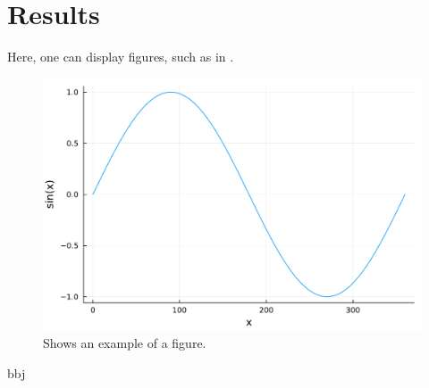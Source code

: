 \section{Results}

Here, one can display figures, such as in .

\begin{figure}
    \centering
    \includegraphics[width=\singlefigure]{figures/example.pdf}
    \caption{\label{fig:example} Shows an example of a figure.}
\end{figure}
bbj

